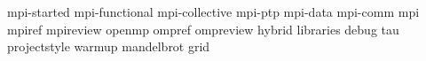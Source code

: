 mpi-started
mpi-functional
mpi-collective
mpi-ptp
mpi-data
mpi-comm
mpi
mpiref
mpireview
openmp
ompref
ompreview
hybrid
libraries
debug
tau
projectstyle
warmup
mandelbrot
grid
